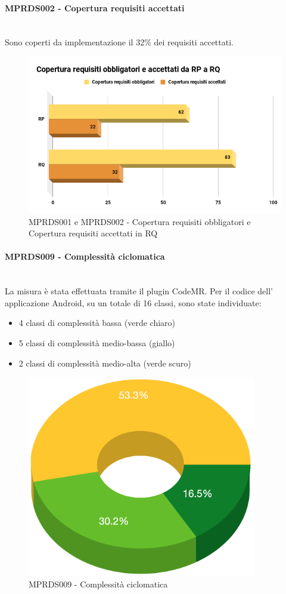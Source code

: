 \paragraph{MPRDS002 - Copertura requisiti accettati}\mbox{}\\[0.4cm]
Sono coperti da implementazione il 32\% dei requisiti accettati.
\begin{figure}[H]
	\centering
	\includegraphics[width=13cm,keepaspectratio]{../includes/pics/Copertura.png}
	\caption{\label{fig:mission}MPRDS001 e MPRDS002 - Copertura requisiti obbligatori e Copertura requisiti accettati in RQ}
\end{figure}
\paragraph{MPRDS009 - Complessità ciclomatica}\mbox{}\\[0.4cm]
La misura è stata effettuata tramite il plugin CodeMR. Per il codice dell' applicazione Android, su un totale di 16 classi, sono state individuate: \begin{itemize}
	\item 4 classi di complessità bassa (verde chiaro)
	\item 5 classi di complessità medio-bassa (giallo)
	\item 2 classi di complessità medio-alta (verde scuro)
\end{itemize}
\begin{figure}[H]
	\centering
	\includegraphics[width=10cm,keepaspectratio]{../includes/pics/complex.png}
	\caption{\label{fig:mission}MPRDS009 - Complessità ciclomatica}
\end{figure}
